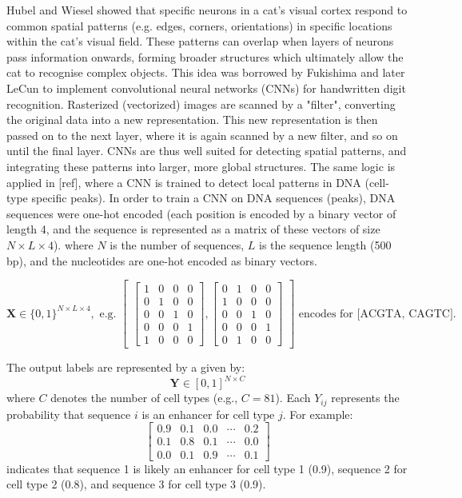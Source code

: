 Hubel and Wiesel showed that specific neurons in a cat's visual cortex respond to common spatial patterns (e.g. edges, corners, orientations) in specific locations within the cat's visual field. These patterns can overlap when layers of neurons pass information onwards, forming broader structures which ultimately allow the cat to recognise complex objects. This idea was borrowed by Fukishima and later LeCun to implement convolutional neural networks (CNNs) for handwritten digit recognition. Rasterized (vectorized) images are scanned by a "filter", converting the original data into a new representation. This new representation is then passed on to the next layer, where it is again scanned by a new filter, and so on until the final layer. CNNs are thus well suited for detecting spatial patterns, and integrating these patterns into larger, more global structures. The same logic is applied in [ref], where a CNN is trained to detect local patterns in DNA (cell-type specific peaks). In order to train a CNN on DNA sequences (peaks), DNA sequences were one-hot encoded (each position is encoded by a binary vector of length 4, and the sequence is represented as a matrix of these vectors of size $N \times L \times 4$). where $N$ is the number of sequences, $L$ is the sequence length (500 bp), and the nucleotides are one-hot encoded as binary vectors.

\[
	\mathbf{X} \in \{0, 1\}^{N \times L \times 4}, \text{ e.g. }
	\begin{bmatrix}
		\begin{bmatrix}
			1 & 0 & 0 & 0 \\
			0 & 1 & 0 & 0 \\
			0 & 0 & 1 & 0 \\
			0 & 0 & 0 & 1 \\
			1 & 0 & 0 & 0
		\end{bmatrix}
		,
		\begin{bmatrix}
			0 & 1 & 0 & 0 \\
			1 & 0 & 0 & 0 \\
			0 & 0 & 1 & 0 \\
			0 & 0 & 0 & 1 \\
			0 & 1 & 0 & 0
		\end{bmatrix}
	\end{bmatrix}
	\text{ encodes for [ACGTA, CAGTC].}
\]

The output labels are represented by a given by:
\[
	\mathbf{Y} \in [0, 1]^{N \times C}
\]
where $C$ denotes the number of cell types (e.g., $C = 81$). Each $Y_{ij}$ represents the probability that sequence $i$ is an enhancer for cell type $j$. For example:
\[
	\begin{bmatrix}
		0.9 & 0.1 & 0.0 & \cdots & 0.2 \\
		0.1 & 0.8 & 0.1 & \cdots & 0.0 \\
		0.0 & 0.1 & 0.9 & \cdots & 0.1
	\end{bmatrix}
\]
indicates that sequence 1 is likely an enhancer for cell type 1 (0.9), sequence 2 for cell type 2 (0.8), and sequence 3 for cell type 3 (0.9).

